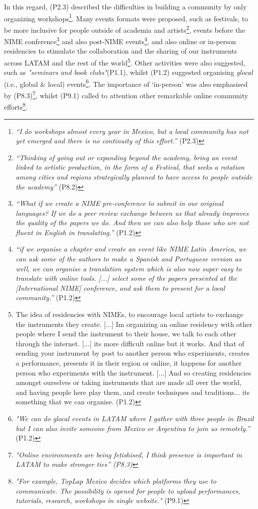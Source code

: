 \documentclass[sigconf]{nimeart}
\begin{document}
In this regard, (P2.3) described the difficulties in building a community by only organizing workshops\footnote{\emph{``I do workshops almost every year in Mexico, but a local community has not yet emerged and there is no continuity of this effort.''} (P2.3)}. Many events formats were proposed, such as festivals, to be more inclusive for people outside of academia and artists\footnote{\emph{``Thinking of going out or expanding beyond the academy, bring an event linked to artistic production, in the form of a Festival, that seeks a rotation among cities and regions strategically planned to have access to people outside the academy''} (P8.2)}, events before the NIME conference\footnote{\emph{``What if we create a NIME pre-conference to submit in our original languages? If we do a peer review exchange between us that already improves the quality of the papers we do. And then we can also help those who are not fluent in English in translating.''} (P1.2)} and also post-NIME events\footnote{\emph{``if we organise a chapter and create an event like NIME Latin America, we can ask some of the authors to make a Spanish and Portuguese version as well, we can organise a translation system which is also now super easy to translate with online tools. {[}...{]} select some of the papers presented at the {[}International NIME{]} conference, and ask them to present for a local community.''} (P1.2)}, and also online or in-person residencies to stimulate the collaboration and the sharing of our instruments across LATAM and the rest of the world\footnote{The idea of residencies with NIMEs, to encourage local artists to exchange the instruments they create. {[}...{]} I\textquotesingle m organizing an online residency with other people where I send the instrument to their house, we talk to each other through the internet. {[}...{]} it\textquotesingle s more difficult online but it works. And that of sending your instrument by post to another person who experiments, creates a performance, presents it in their region or online, it happens for another person who experiments with the instrument. {[}...{]} And so creating residencies amongst ourselves or taking instruments that are made all over the world, and having people here play them, and create techniques and traditions... it\textquotesingle s something that we can organise. (P1.2)}. Other activities were also suggested, such as \emph{"seminars and book clubs"}(P1.1), \emph{} whilst (P1.2) suggested organising \emph{glocal} (i.e., global \& local) \emph{} events\footnote{\emph{"We can do glocal events in LATAM where I gather with three people in Brazil but I can also invite someone from Mexico or Argentina to join us remotely.''} (P1.2)}. The importance of `in-person' was also emphasised by (P8.3)\footnote{\emph{"Online environments are being fetishised, I think presence is important in LATAM to make stronger ties'' (P8.3)}}, whilst (P9.1) called to attention other remarkable online community efforts\footnote{\emph{"For example, TopLap Mexico decides which platforms they use to communicate. The possibility is opened for people to upload performances, tutorials, research, workshops in single website."} (P9.1)}.
\end{document}
